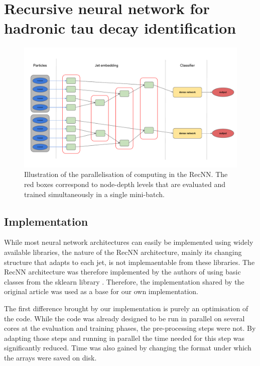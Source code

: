 \section{Recursive neural network for hadronic tau decay identification}


\begin{figure}
    \centering
    \includegraphics[width=\textwidth]{Images/RecNN_diagram_parall1.pdf}
    \caption{Illustration of the parallelisation of computing in the RecNN. The red boxes correspond to node-depth levels that are evaluated and trained simultaneously in a single mini-batch.}
    \label{fig:RecNN_parall}
\end{figure}



\subsection{Implementation}

While most neural network architectures can easily be implemented using widely available libraries, the nature of the RecNN architecture, mainly its changing structure that adapts to each jet, is not implemaentable from these libraries. The RecNN architecture was therefore implemented by the authors of \cite{Louppe:2017ipp} using basic classes from the sklearn library \cite{scikit-learn}. Therefore, the implementation shared by the original article \cite{Louppe:2017ipp} was used as a base for our own implementation. 

The first difference brought by our implementation is purely an optimisation of the code. While the code was already designed to be run in parallel on several cores at the evaluation and training phases, the pre-processing steps were not. By adapting those steps and running in parallel the time needed for this step was significantly reduced. Time was also gained by changing the format under which the arrays were saved on disk.

